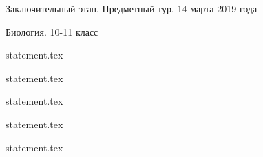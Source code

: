 \documentclass[a4paper,11pt, oneside]{book}
\begin{document}
\vspace{-3mm}
\vspace{-5mm}

\normalsize

\begin{center}
    Заключительный этап. Предметный тур. 14 марта 2019 года
    
    Биология. 10-11 класс
\end{center}

\parindent=0cm

{statement.tex}

{statement.tex}

\newpage

{statement.tex}

{statement.tex}

{statement.tex}
\end{document}
